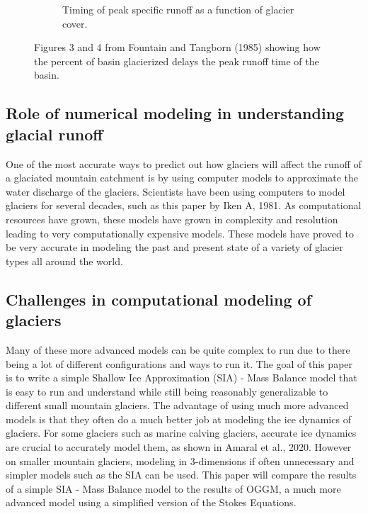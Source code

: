 \documentclass{article}
\begin{document}
\begin{figure}[h]
\begin{subfigure}[b]{0.49\textwidth}
        \caption{Timing of peak specific runoff as a function of glacier cover.}
        \label{fig:subfig2}
    \end{subfigure}
    \caption{Figures 3 and 4 from Fountain and Tangborn (1985) showing how the percent of basin glacierized delays the peak runoff time of the basin.}
    \label{fig:main_figure}
\end{figure}
\FloatBarrier
\subsection{Role of numerical modeling in understanding glacial runoff}
One of the most accurate ways to predict out how glaciers will affect the runoff of a glaciated mountain catchment is by using computer 
models to approximate the water discharge of the glaciers. Scientists have been using computers to model glaciers for several decades, 
such as this paper by Iken A, 1981. As computational resources have grown, these models have grown in complexity and resolution leading 
to very computationally expensive models. These models have proved to be very accurate in modeling the past and present state of a variety 
of glacier types all around the world.

\subsection{Challenges in computational modeling of glaciers}
Many of these more advanced models can be quite complex to run due to there being a lot of different configurations and ways to run it. The 
goal of this paper is to write a simple Shallow Ice Approximation (SIA) - Mass Balance model that is easy to run and understand while still 
being reasonably generalizable to different small mountain glaciers. The advantage of using much more advanced models is that they often do 
a much better job at modeling the ice dynamics of glaciers. For some glaciers such as marine calving glaciers, accurate ice dynamics are 
crucial to accurately model them, as shown in Amaral et al., 2020. However on smaller mountain glaciers, modeling in 3-dimensions if often 
unnecessary and simpler models such as the SIA can be used. This paper will compare the results of a simple SIA - Mass Balance model to the 
results of OGGM, a much more advanced model using a simplified version of the Stokes Equations.
\end{document}
